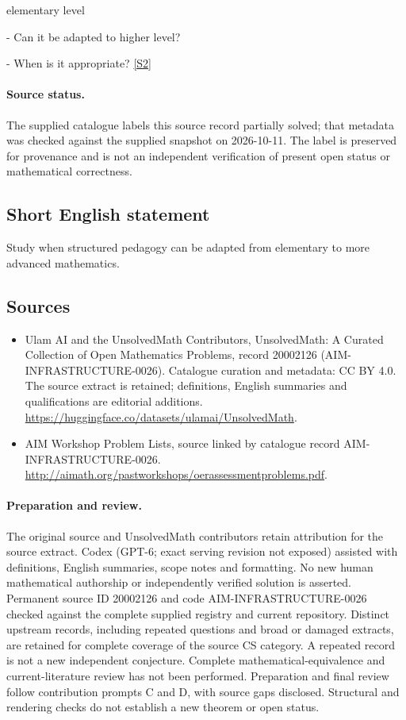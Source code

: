 \documentclass[11pt]{article}
\newcommand{\sref}[2]{\hyperlink{source:#1:#2}{[S#2]}}
\begin{document}
elementary level

- Can it be adapted to higher level?

- When is it appropriate? \sref{20002126}{2}
\paragraph{Source status.}
The supplied catalogue labels this source record partially solved; that metadata was checked against the supplied snapshot on 2026-10-11. The label is preserved for provenance and is not an independent verification of present open status or mathematical correctness.
\subsection{Short English statement}
Study when structured pedagogy can be adapted from elementary to more advanced mathematics.
\subsection{Sources}
\begin{itemize}
\item[\hypertarget{source:20002126:1}{S1}] Ulam AI and the UnsolvedMath Contributors, UnsolvedMath: A Curated Collection of Open Mathematics Problems, record 20002126 (AIM-INFRASTRUCTURE-0026). Catalogue curation and metadata: CC BY 4.0. The source extract is retained; definitions, English summaries and qualifications are editorial additions.
\url{https://huggingface.co/datasets/ulamai/UnsolvedMath}.
\item[\hypertarget{source:20002126:2}{S2}] AIM Workshop Problem Lists, source linked by catalogue record AIM-INFRASTRUCTURE-0026.
\url{http://aimath.org/pastworkshops/oerassessmentproblems.pdf}.
\end{itemize}
\paragraph{Preparation and review.}
The original source and UnsolvedMath contributors retain attribution for the source extract. Codex (GPT-6; exact serving revision not exposed) assisted with definitions, English summaries, scope notes and formatting. No new human mathematical authorship or independently verified solution is asserted. Permanent source ID 20002126 and code AIM-INFRASTRUCTURE-0026 checked against the complete supplied registry and current repository. Distinct upstream records, including repeated questions and broad or damaged extracts, are retained for complete coverage of the source CS category. A repeated record is not a new independent conjecture. Complete mathematical-equivalence and current-literature review has not been performed. Preparation and final review follow contribution prompts C and D, with source gaps disclosed. Structural and rendering checks do not establish a new theorem or open status.
\label{end:20002126}
\end{document}
